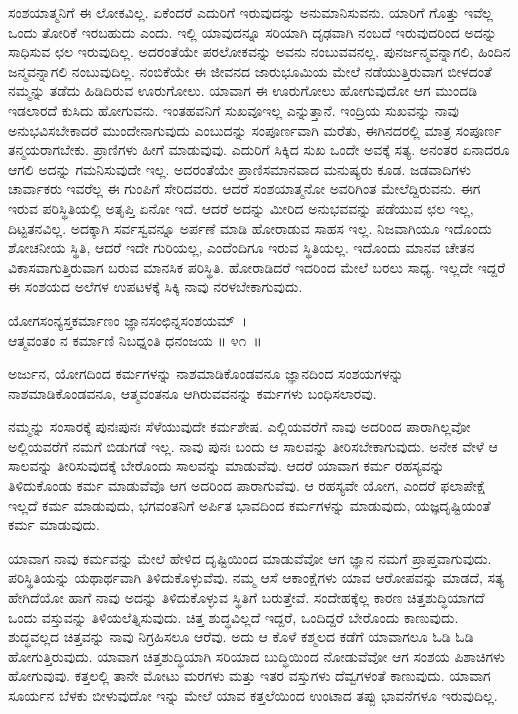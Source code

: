ಸಂಶಯಾತ್ಮನಿಗೆ ಈ ಲೋಕವಿಲ್ಲ. ಏಕೆಂದರೆ ಎದುರಿಗೆ ಇರುವುದನ್ನು ಅನುಮಾನಿಸುವನು. ಯಾರಿಗೆ ಗೊತ್ತು ಇವೆಲ್ಲ ಒಂದು ತೋರಿಕೆ ಇರಬಹುದು ಎಂದು. ಇಲ್ಲಿ ಯಾವುದನ್ನೂ ಸರಿಯಾಗಿ ದೃಢವಾಗಿ ನಂಬದೆ ಇರುವುದರಿಂದ ಅದನ್ನು ಸಾಧಿಸುವ ಛಲ ಇರುವುದಿಲ್ಲ. ಅದರಂತೆಯೇ ಪರಲೋಕವನ್ನು ಅವನು ನಂಬುವವನಲ್ಲ. ಪುನರ್ಜನ್ಮವನ್ನಾಗಲಿ, ಹಿಂದಿನ ಜನ್ಮವನ್ನಾಗಲಿ ನಂಬುವುದಿಲ್ಲ. ನಂಬಿಕೆಯೇ ಈ ಜೀವನದ ಜಾರುಭೂಮಿಯ ಮೇಲೆ ನಡೆಯುತ್ತಿರುವಾಗ ಬೀಳದಂತೆ ನಮ್ಮನ್ನು ತಡೆದು ಹಿಡಿದಿರುವ ಊರುಗೋಲು. ಯಾವಾಗ ಈ ಊರುಗೋಲು ಹೋಗುವುದೋ ಆಗ ಮುಂದಡಿ ಇಡಲಾರದೆ ಕುಸಿದು ಹೋಗುವನು. ಇಂತಹವನಿಗೆ ಸುಖವೂ\break ಇಲ್ಲ ಎನ್ನುತ್ತಾನೆ. ಇಂದ್ರಿಯ ಸುಖವನ್ನು ನಾವು ಅನುಭವಿಸಬೇಕಾದರೆ ಮುಂದೇನಾಗುವುದು ಎಂಬುದನ್ನು ಸಂಪೂರ್ಣವಾಗಿ ಮರೆತು, ಈಗಿನದರಲ್ಲಿ ಮಾತ್ರ ಸಂಪೂರ್ಣ ತನ್ಮಯರಾಗಬೇಕು. ಪ್ರಾಣಿಗಳು ಹೀಗೆ ಮಾಡುವುವು. ಎದುರಿಗೆ ಸಿಕ್ಕಿದ ಸುಖ ಒಂದೇ ಅವಕ್ಕೆ ಸತ್ಯ. ಅನಂತರ ಏನಾದರೂ ಆಗಲಿ ಅದನ್ನು ಗಮನಿಸುವುದೇ ಇಲ್ಲ. ಅದರಂತೆಯೇ ಪ್ರಾಣಿಸಮಾನವಾದ ಮನುಷ್ಯರು ಕೂಡ. ಜಡವಾದಿಗಳು ಚಾರ್ವಾಕರು ಇವರೆಲ್ಲ ಈ ಗುಂಪಿಗೆ ಸೇರಿದವರು. ಆದರೆ ಸಂಶಯಾತ್ಮನೋ ಅವರಿಗಿಂತ ಮೇಲೆದ್ದಿರುವನು. ಈಗ ಇರುವ ಪರಿಸ್ಥಿತಿಯಲ್ಲಿ ಅತೃಪ್ತಿ ಏನೋ ಇದೆ. ಆದರೆ ಅದನ್ನು ಮೀರಿದ ಅನುಭವವನ್ನು ಪಡೆಯುವ ಛಲ ಇಲ್ಲ, ದಿಟ್ಟತನವಿಲ್ಲ. ಅದಕ್ಕಾಗಿ ಸರ್ವಸ್ವವನ್ನೂ ಅರ್ಪಣೆ ಮಾಡಿ ಹೋರಾಡುವ ಸಾಹಸ ಇಲ್ಲ. ನಿಜವಾಗಿಯೂ ಇದೊಂದು ಶೋಚನೀಯ ಸ್ಥಿತಿ, ಆದರೆ ಇದೇ ಗುರಿಯಲ್ಲ, ಎಂದೆಂದಿಗೂ ಇರುವ ಸ್ಥಿತಿಯಲ್ಲ. ಇದೊಂದು ಮಾನವ ಚೇತನ ವಿಕಾಸವಾಗುತ್ತಿರುವಾಗ ಬರುವ ಮಾನಸಿಕ ಪರಿಸ್ಥಿತಿ. ಹೋರಾಡಿದರೆ ಇದರಿಂದ ಮೇಲೆ ಬರಲು ಸಾಧ್ಯ. ಇಲ್ಲದೇ ಇದ್ದರೆ ಈ ಸಂಶಯದ ಅಲೆಗಳ ಉಪಟಳಕ್ಕೆ ಸಿಕ್ಕಿ ನಾವು ನರಳಬೇಕಾಗುವುದು.

\begin{shloka}
ಯೋಗಸಂನ್ಯಸ್ತಕರ್ಮಾಣಂ ಜ್ಞಾನಸಂಛಿನ್ನಸಂಶಯಮ್~।\\ಆತ್ಮವಂತಂ ನ ಕರ್ಮಾಣಿ ನಿಬಧ್ನಂತಿ ಧನಂಜಯ \hfill॥ ೪೧~॥
\end{shloka}

\begin{artha}
ಅರ್ಜುನ, ಯೋಗದಿಂದ ಕರ್ಮಗಳನ್ನು ನಾಶಮಾಡಿಕೊಂಡವನೂ ಜ್ಞಾನದಿಂದ ಸಂಶಯಗಳನ್ನು ನಾಶಮಾಡಿಕೊಂಡವನೂ, ಆತ್ಮವಂತನೂ ಆಗಿರುವವನನ್ನು ಕರ್ಮಗಳು ಬಂಧಿಸಲಾರವು.
\end{artha}

ನಮ್ಮನ್ನು ಸಂಸಾರಕ್ಕೆ ಪುನಃಪುನಃ ಸೆಳೆಯುವುದೇ ಕರ್ಮಶೇಷ. ಎಲ್ಲಿಯವರೆಗೆ ನಾವು ಅದರಿಂದ ಪಾರಾಗಿಲ್ಲವೋ ಅಲ್ಲಿಯವರೆಗೆ ನಮಗೆ ಬಿಡುಗಡೆ ಇಲ್ಲ. ನಾವು ಪುನಃ ಬಂದು ಆ ಸಾಲವನ್ನು ತೀರಿಸಬೇಕಾಗುವುದು. ಅನೇಕ ವೇಳೆ ಆ ಸಾಲವನ್ನು ತೀರಿಸುವುದಕ್ಕೆ ಬೇರೊಂದು ಸಾಲವನ್ನು ಮಾಡುವೆವು. ಆದರೆ ಯಾವಾಗ ಕರ್ಮ ರಹಸ್ಯವನ್ನು ತಿಳಿದುಕೊಂಡು ಕರ್ಮ ಮಾಡುವೆವೊ ಆಗ ಅದರಿಂದ ಪಾರಾಗುವೆವು. ಆ ರಹಸ್ಯವೇ ಯೋಗ, ಎಂದರೆ ಫಲಾಪೇಕ್ಷೆ ಇಲ್ಲದೆ ಕರ್ಮ ಮಾಡುವುದು, ಭಗವಂತನಿಗೆ ಅರ್ಪಿತ ಭಾವದಿಂದ ಕರ್ಮಗಳನ್ನು ಮಾಡುವುದು, ಯಜ್ಞದೃಷ್ಟಿಯಂತೆ ಕರ್ಮ ಮಾಡುವುದು.

ಯಾವಾಗ ನಾವು ಕರ್ಮವನ್ನು ಮೇಲೆ ಹೇಳಿದ ದೃಷ್ಟಿಯಿಂದ ಮಾಡುವೆವೋ ಆಗ ಜ್ಞಾನ ನಮಗೆ ಪ್ರಾಪ್ತವಾಗುವುದು. ಪರಿಸ್ಥಿತಿಯನ್ನು ಯಥಾರ್ಥವಾಗಿ ತಿಳಿದುಕೊಳ್ಳುವೆವು. ನಮ್ಮ ಆಸೆ ಆಕಾಂಕ್ಷೆಗಳು ಯಾವ ಆರೋಪವನ್ನು ಮಾಡದೆ, ಸತ್ಯ ಹೇಗಿದೆಯೋ ಹಾಗೆ ನಾವು ಅದನ್ನು ತಿಳಿದುಕೊಳ್ಳುವ ಸ್ಥಿತಿಗೆ ಬರುತ್ತೇವೆ. ಸಂದೇಹಕ್ಕೆಲ್ಲ ಕಾರಣ ಚಿತ್ತಶುದ್ಧಿಯಾಗದೆ ಒಂದು ವಸ್ತುವನ್ನು ತಿಳಿಯಲೆತ್ನಿಸುವುದು. ಚಿತ್ತ ಶುದ್ಧವಿಲ್ಲದೆ ಇದ್ದರೆ, ಒಂದಿದ್ದರೆ ಬೇರೊಂದು ಕಾಣುವುದು. ಶುದ್ಧವಲ್ಲದ ಚಿತ್ತವನ್ನು ನಾವು ನಿಗ್ರಹಿಸಲೂ ಆರೆವು. ಅದು ಆ ಕೊಳೆ ಕಶ್ಮಲದ ಕಡೆಗೆ ಯಾವಾಗಲೂ ಓಡಿ ಓಡಿ ಹೋಗುತ್ತಿರುವುದು. ಯಾವಾಗ ಚಿತ್ತಶುದ್ಧಿಯಾಗಿ ಸರಿಯಾದ ಬುದ್ಧಿಯಿಂದ ನೋಡುವೆವೋ ಆಗ ಸಂಶಯ ಪಿಶಾಚಿಗಳು ಹೋಗುವುವು. ಕತ್ತಲಲ್ಲಿ ತಾನೇ ಮೋಟು ಮರಗಳು ಮತ್ತು ಇತರ ವಸ್ತುಗಳು ದೆವ್ವಗಳಂತೆ ಕಾಣುವುದು. ಯಾವಾಗ ಸೂರ್ಯನ ಬೆಳಕು ಬೀಳುವುದೋ ಇನ್ನು ಮೇಲೆ ಯಾವ ಕತ್ತಲೆಯಿಂದ ಉಂಟಾದ ತಪ್ಪು ಭಾವನೆಗಳೂ ಇರುವುದಿಲ್ಲ.

